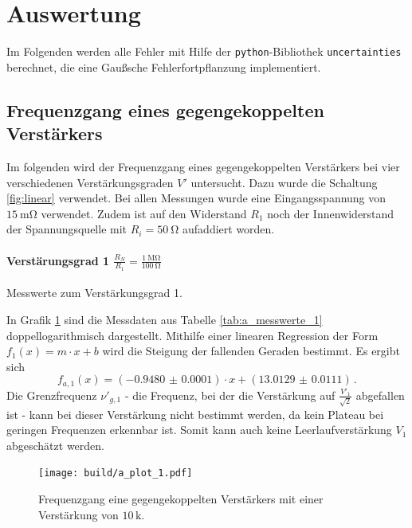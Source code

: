 \FloatBarrier

\section{Auswertung}
\label{sec:auswertung}
Im Folgenden werden alle Fehler mit Hilfe der \texttt{python}-Bibliothek
\texttt{uncertainties}\cite{py-uncertainties} berechnet, die eine Gaußsche
Fehlerfortpflanzung implementiert.

\subsection{Frequenzgang eines gegengekoppelten Verstärkers} %

Im folgenden wird der Frequenzgang eines gegengekoppelten Verstärkers bei vier verschiedenen Verstärkungsgraden $V'$ untersucht.
Dazu wurde die Schaltung \ref{fig:linear} verwendet.
Bei allen Messungen wurde eine Eingangsspannung von $\SI{15}{\milli\ohm}$ verwendet.
Zudem ist auf den Widerstand $R_1$ noch der Innenwiderstand der Spannungsquelle mit $R_i = \SI{50}{\ohm}$ aufaddiert worden.

\paragraph{Verstärungsgrad 1 $\frac{R_N}{R_1} = \frac{\SI{1}{\mega\ohm}}{\SI{100}{\ohm}}$}

\begin{table}
\centering
\caption{Messwerte zum Verstärkungsgrad 1.}
    \label{tab:a_messwerte_1}
    
\end{table}

In Grafik \ref{fig:a_plot_1} sind die Messdaten aus Tabelle \ref{tab:a_messwerte_1} doppellogarithmisch dargestellt.
Mithilfe einer linearen Regression der Form $f_1(x)= m \cdot x + b$ wird die Steigung der fallenden Geraden bestimmt.
Es ergibt sich
\begin{equation*}
	f_{a,1}(x) = (\num{-0.9480(1)}) \cdot x + (\num{13.0129(111)})\,.
\end{equation*}
Die Grenzfrequenz $\nu'_{g,1}$ - die Frequenz, bei der die Verstärkung auf $\frac{V'_1}{\sqrt{2}}$ abgefallen ist - kann bei dieser Verstärkung nicht bestimmt werden, da kein Plateau bei geringen Frequenzen erkennbar ist.
Somit kann auch keine Leerlaufverstärkung $V_1$ abgeschätzt werden.

\begin{figure}[h!]
    \centering
    \texttt{[image: build/a\_plot\_1.pdf]}
    \caption{Frequenzgang eine gegengekoppelten Verstärkers mit einer Verstärkung von $10\,\mathrm{k}$.}
    \label{fig:a_plot_1}
\end{figure}

